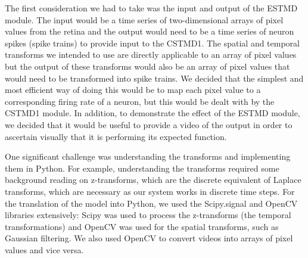 \documentclass[a4paper,11pt]{article}
\begin{document}
The first consideration we had to take was the input and output of the ESTMD module. The input would be a time series of two-dimensional arrays of pixel values from the retina and the output would need to be a time series of neuron spikes (spike trains) to provide input to the CSTMD1. The spatial and temporal transforms we intended to use are directly applicable to an array of pixel values but the output of these transforms would also be an array of pixel values that would need to be transformed into spike trains. We decided that the simplest and most efficient way of doing this would be to map each pixel value to a corresponding firing rate of a neuron, but this would be dealt with by the CSTMD1 module. In addition, to demonstrate the effect of the ESTMD module, we decided that it would be useful to provide a video of the output in order to ascertain visually that it is performing its expected function.

	One significant challenge was understanding the transforms and implementing them in Python. For example, understanding the transforms required some background reading on z-transforms, which are the discrete equivalent of Laplace transforms, which are necessary as our system works in discrete time steps. For the translation of the model into Python, we used the Scipy.signal and OpenCV \cite{opencv} libraries extensively: Scipy was used to process the z-transforms (the temporal transformations) and OpenCV was used for the spatial transforms, such as Gaussian filtering. We also used OpenCV to convert videos into arrays of pixel values and vice versa.
	
\end{document}
